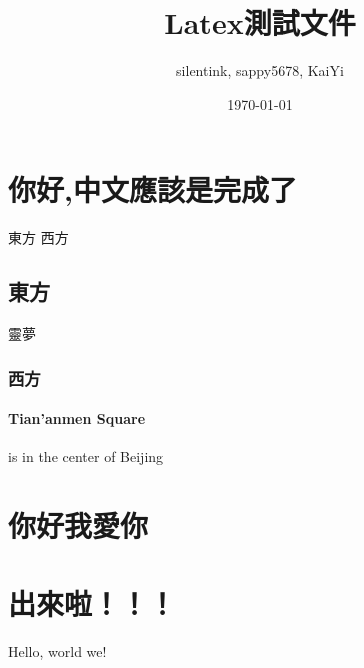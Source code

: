 \documentclass[UTF8,12pt,a4paper]{article}
\title{Latex測試文件}
\author{silentink, sappy5678, KaiYi}
\date{\today}
\begin{document}
\maketitle
\tableofcontents
\section{你好,中文應該是完成了}
東方 西方
\subsection{東方}
靈夢
\subsubsection{西方}
\paragraph{Tian'anmen Square}
is in the center of Beijing
\section{你好我愛你}

\section{出來啦！！！}
Hello, world we!
\end{document}
